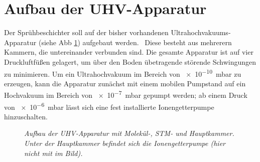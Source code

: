 \section{Aufbau der UHV-Apparatur}\label{kapaufbau}

Der Sprühbeschichter soll auf der bisher vorhandenen Ultrahochvakuums-Apparatur (siehe Abb
\ref{uhvaufbau}) aufgebaut werden.~%
 Diese besteht aus mehrerern Kammern, die untereinander verbunden sind. Die gesamte Apparatur ist
auf vier Druckluftfüßen gelagert, um über den Boden übetragende störende Schwingungen zu minimieren. Um ein
Ultrahochvakuum im Bereich von \SI{e-10}{mbar} zu erzeugen, kann die Apparatur zunächst mit einem
mobilen Pumpstand %
auf ein Hochvakuum im Bereich von
\SI{e-7}{mbar} gepumpt werden; ab einem Druck von \SI{e-6}{mbar} lässt sich eine fest installierte
Ionengetterpumpe hinzuschalten.

\begin{figure}[H]
\centering
\sffamily

\caption{\textit{Aufbau der UHV-Apparatur mit Molekül-, STM- und Hauptkammer. Unter der
Hauptkammer befindet sich die Ionengetterpumpe (hier nicht mit im Bild).}}
\label{uhvaufbau}
\end{figure}

